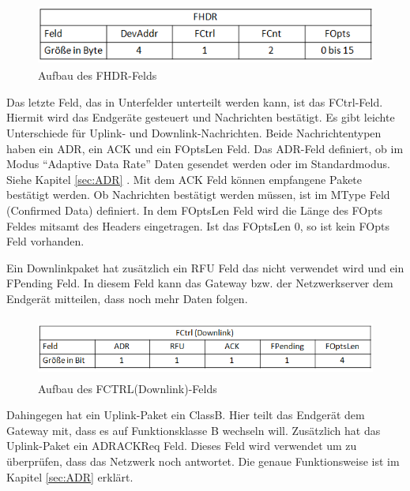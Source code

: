 \documentclass[a4paper, 12pt]{article}
\begin{document}
                \begin{figure}[ht]
                    \centering
                    \includegraphics[height=2cm]{FHDR}
                    \caption{Aufbau des FHDR-Felds}
                \end{figure}

                Das letzte Feld, das in Unterfelder unterteilt werden kann, ist das FCtrl-Feld. Hiermit wird das Endgeräte 
                gesteuert und Nachrichten bestätigt. Es gibt leichte Unterschiede für Uplink- und Downlink-Nachrichten. 
                Beide Nachrichtentypen haben ein ADR, ein ACK und ein FOptsLen Feld. Das ADR-Feld definiert, 
                ob im Modus ``Adaptive Data Rate'' Daten gesendet werden oder im Standardmodus. Siehe Kapitel \ref{sec:ADR} . 
                Mit dem ACK Feld können empfangene Pakete bestätigt werden. Ob Nachrichten bestätigt werden müssen,
                ist im MType Feld (Confirmed Data) definiert. In dem FOptsLen Feld wird die Länge des FOpts Feldes mitsamt des 
                Headers eingetragen. Ist das FOptsLen 0, so ist kein FOpts Feld vorhanden.

                
                Ein Downlinkpaket hat zusätzlich ein RFU Feld das nicht verwendet wird und ein FPending Feld. In diesem 
                Feld kann das Gateway bzw. der Netzwerkserver dem Endgerät mitteilen, dass noch mehr Daten folgen.

                \begin{figure}[ht]
                    \centering
                    \includegraphics[height=2cm]{FCtrlDownlink}
                    \caption{Aufbau des FCTRL(Downlink)-Felds}
                \end{figure}

                Dahingegen hat ein Uplink-Paket ein ClassB. Hier teilt das Endgerät dem Gateway mit, dass es auf 
                Funktionsklasse B wechseln will. Zusätzlich hat das Uplink-Paket ein ADRACKReq Feld. Dieses Feld 
                wird verwendet um zu überprüfen, dass das Netzwerk noch antwortet. 
                Die genaue Funktionsweise ist im Kapitel \ref{sec:ADR}  erklärt.
\end{document}
